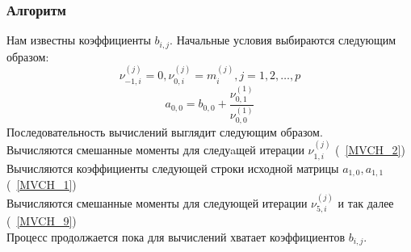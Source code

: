 \subsubsection {Алгоритм}
Нам известны коэффициенты $b_{i,j}$. Начальные условия выбираются
следующим образом:
$$
\nu_{-1,i}^{(j)}=0, \nu_{0,i}^{(j)}=m_i^{(j)}, j=1,2,\ldots,p
$$
$$
a_{0,0} = b_{0,0}+\frac{\nu_{0,1}^{(1)}}{\nu_{0,0}^{(1)}}
$$
Последовательность вычислений выглядит следующим образом.\\
Вычисляются смешанные моменты для
следуaщей итерации $\nu_{1,i}^{(j)}$  (~\ref{MVCH_2})\\
Вычисляются коэффициенты следующей строки
исходной матрицы $a_{1,0}, a_{1,1}$ (~\ref{MVCH_1})\\
Вычисляются смешанные моменты для
следующей итерации $\nu_{5,i}^{(j)}$ и так далее (~\ref{MVCH_9})\\
Процесс продолжается пока для вычислений хватает коэффициентов
$b_{i,j}$.

